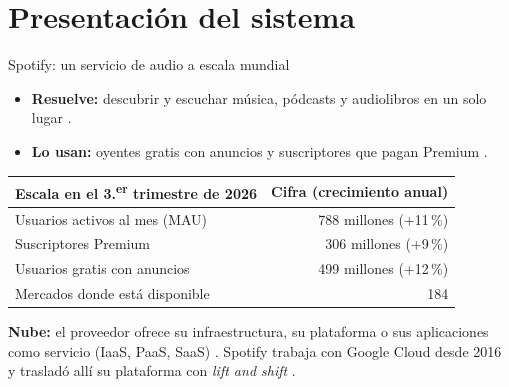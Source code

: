 
\section{Presentación del sistema}

\begin{frame}{Spotify: un servicio de audio a escala mundial}
  \begin{itemize}
    \item \textbf{Resuelve:} descubrir y escuchar música, pódcasts y
      audiolibros en un solo lugar \cite{spotifyAbout2026}.
    \item \textbf{Lo usan:} oyentes gratis con anuncios y suscriptores
      que pagan Premium \cite[p.~3]{spotifyQ32026}.
  \end{itemize}

  \medskip
  \centering
  \begin{tabular}{@{}lr@{}}
    \toprule
    \textbf{Escala en el 3.\textsuperscript{er} trimestre de 2026} &
      \textbf{Cifra (crecimiento anual)} \\
    \midrule
    Usuarios activos al mes (MAU)  & 788 millones (+11\,\%) \cite[p.~3]{spotifyQ32026} \\
    Suscriptores Premium           & 306 millones (+9\,\%) \cite[p.~3]{spotifyQ32026} \\
    Usuarios gratis con anuncios   & 499 millones (+12\,\%) \cite[p.~3]{spotifyQ32026} \\
    Mercados donde está disponible & 184 \cite{spotifyAbout2026} \\
    \bottomrule
  \end{tabular}

  \medskip
  \raggedright
  {\footnotesize \textbf{Nube:} el proveedor ofrece su infraestructura, su
  plataforma o sus aplicaciones como servicio (IaaS, PaaS, SaaS)
  \cite[p.~99]{vansteen2023ds}. Spotify trabaja con Google Cloud desde
  2016 y trasladó allí su plataforma con \emph{lift and shift}
  \cite{strid2023fleet}.\par}
\end{frame}
